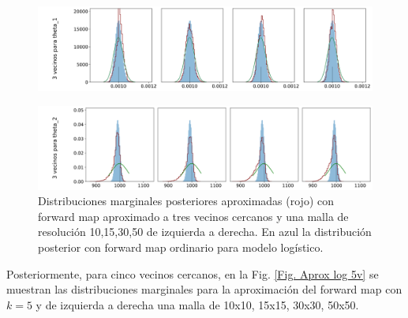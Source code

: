 \begin{figure}[H] 
    \centering 
    \includegraphics[width = 16 cm ]{img/Exp_Central_logistico_Sigma/Figuras/Generales/Convergencia_theta1_1_logistico_sigma.png} 
\end{figure} 
\begin{figure}[H] 
    \centering 
    \includegraphics[width = 16 cm ]{img/Exp_Central_logistico_Sigma/Figuras/Generales/Convergencia_theta2_1_logistico_sigma.png} 
    \caption{Distribuciones marginales posteriores aproximadas (rojo) con forward map aproximado a tres vecinos cercanos y una malla de resolución 10,15,30,50 de izquierda a derecha. En azul la distribución posterior con forward map ordinario para modelo logístico.}
    \label{Fig. Aprox log 3v}
\end{figure} 

Posteriormente, para cinco vecinos cercanos, en la Fig. \ref{Fig. Aprox log 5v} se muestran las distribuciones marginales para la aproximación del forward map con $k = 5$ y de izquierda a derecha una malla de 10x10, 15x15, 30x30, 50x50.


